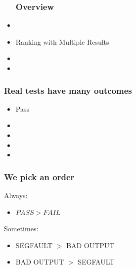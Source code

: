\documentclass[svgnames,14pt]{beamer}
\newcommand\fail{\mathit{FAIL}}
\newcommand\pass{\mathit{PASS}}
\theoremstyle{definition}
\begin{document}
\begin{frame}
\begin{itemize}
\frametitle{Overview}
\item {}
\item Ranking with Multiple Results
\item {}
\item {}
\end{itemize}
\end{frame}


\begin{frame}
\frametitle{Real tests have many outcomes}
\begin{itemize}
\item Pass
\item {}
\item {}
\item {}
\item {}
\end{itemize}
\end{frame}

\begin{frame}
\frametitle{We pick an order}
Always:
\begin{itemize}
\item $\pass>\fail$
\end{itemize}
Sometimes:
\begin{itemize}
\item SEGFAULT $>$ BAD OUTPUT
\item BAD OUTPUT $>$ SEGFAULT
\end{itemize}
\end{frame}
\end{document}
